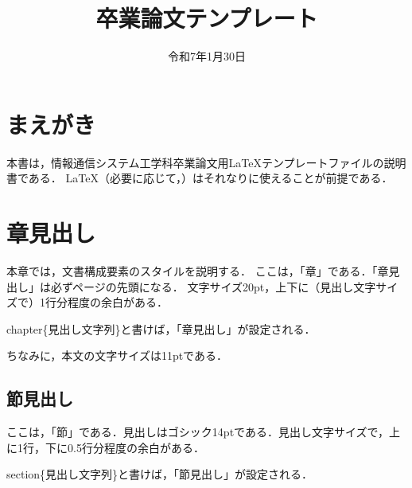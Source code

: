 \documentclass[11pt]{icsthesis}
\title{卒業論文テンプレート}
\date{令和7年1月30日}
\begin{document}
\maketitle
\pagestyle{fancy}
\fancyhead[R]{\nouppercase{\fontsize{10.5pt}{0pt}\selectfont\rightmark}}
\fancyhead[L]{\nouppercase{\fontsize{10.5pt}{0pt}\selectfont\leftmark}}
\fancyfoot[C]{--\ \thepage\ --}
\renewcommand{\headrulewidth}{0.3truemm}
\setcounter{tocdepth}{4}
\pagestyle{fancy}
\fancyfoot[C]{--\ \thepage\ --}
{\makeatletter
\let\ps@jpl@in\ps@empty
\makeatother
\pagestyle{plain}
\tableofcontents
\clearpage}

\chapter{まえがき}
本書は，情報通信システム工学科卒業論文用\LaTeX テンプレートファイルの説明書である．
\LaTeX （必要に応じて，\BibTeX）はそれなりに使えることが前提である．

\chapter{章見出し}
本章では，文書構成要素のスタイルを説明する．
ここは，「章」である．「章見出し」は必ずページの先頭になる．
文字サイズ20pt，上下に（見出し文字サイズで）1行分程度の余白がある．

\textsf{\yen chapter\{見出し文字列\}}と書けば，「章見出し」が設定される．

ちなみに，本文の文字サイズは11ptである．

\section{節見出し}
ここは，「節」である．見出しはゴシック14ptである．見出し文字サイズで，上に1行，下に0.5行分程度の余白がある．

\textsf{\yen section\{見出し文字列\}}と書けば，「節見出し」が設定される．
\end{document}
